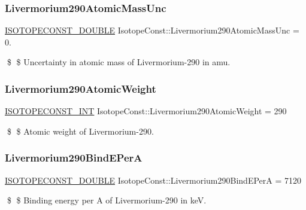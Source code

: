 \subsubsection{\texorpdfstring{Livermorium290\+Atomic\+Mass\+Unc}{Livermorium290AtomicMassUnc}}
{\footnotesize\ttfamily \mbox{\hyperlink{group___isotope_const-_macros_ga8f45a7272ce02c0b4c65c44636ed719a}{I\+S\+O\+T\+O\+P\+E\+C\+O\+N\+S\+T\+\_\+\+D\+O\+U\+B\+LE}} Isotope\+Const\+::\+Livermorium290\+Atomic\+Mass\+Unc = 0.}

\$ \$ Uncertainty in atomic mass of Livermorium-\/290 in amu. \mbox{\label{group___isotope_const-_livermorium-_lv290_ga890bbd600bfb6e272e8426019da81415}} 
\subsubsection{\texorpdfstring{Livermorium290\+Atomic\+Weight}{Livermorium290AtomicWeight}}
{\footnotesize\ttfamily \mbox{\hyperlink{group___isotope_const-_macros_ga5f18360b3e99483a35c32d789e62621c}{I\+S\+O\+T\+O\+P\+E\+C\+O\+N\+S\+T\+\_\+\+I\+NT}} Isotope\+Const\+::\+Livermorium290\+Atomic\+Weight = 290}

\$ \$ Atomic weight of Livermorium-\/290. \mbox{\label{group___isotope_const-_livermorium-_lv290_gae5780458aa6d9a22576776c3cdbdcfd3}} 
\subsubsection{\texorpdfstring{Livermorium290\+Bind\+E\+PerA}{Livermorium290BindEPerA}}
{\footnotesize\ttfamily \mbox{\hyperlink{group___isotope_const-_macros_ga8f45a7272ce02c0b4c65c44636ed719a}{I\+S\+O\+T\+O\+P\+E\+C\+O\+N\+S\+T\+\_\+\+D\+O\+U\+B\+LE}} Isotope\+Const\+::\+Livermorium290\+Bind\+E\+PerA = 7120}

\$ \$ Binding energy per A of Livermorium-\/290 in keV. \mbox{\label{group___isotope_const-_livermorium-_lv290_gaf15477802da1abc6308e55e110369e84}} 
